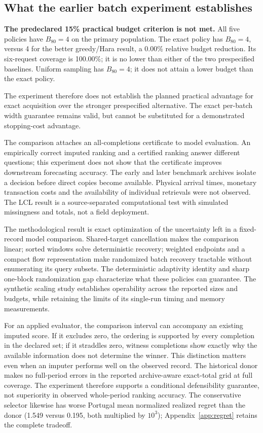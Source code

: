 \documentclass[12pt]{article}
\begin{document}
\subsection{What the earlier batch experiment establishes}
\textbf{The predeclared 15\% practical budget criterion is not met.} All five policies have $B_{80}=4$ on the primary population. The exact policy has $B_{80}=4$, versus 4 for the better greedy/Hara result, a 0.00\% relative budget reduction. Its six-request coverage is 100.00\%; it is no lower than either of the two prespecified baselines. Uniform sampling has $B_{80}=4$; it does not attain a lower budget than the exact policy.

The experiment therefore does not establish the planned practical advantage for exact acquisition over the stronger prespecified alternative. The exact per-batch width guarantee remains valid, but cannot be substituted for a demonstrated stopping-cost advantage.

The comparison attaches an all-completions certificate to model evaluation. An empirically correct imputed ranking and a certified ranking answer different questions; this experiment does not show that the certificate improves downstream forecasting accuracy. The early and later benchmark archives isolate a decision before direct copies become available. Physical arrival times, monetary transaction costs and the availability of individual retrievals were not observed. The LCL result is a source-separated computational test with simulated missingness and totals, not a field deployment.

The methodological result is exact optimization of the uncertainty left in
a fixed-record model comparison. Shared-target cancellation makes the
comparison linear; sorted windows solve deterministic recovery; weighted
endpoints and a compact flow representation make randomized batch recovery
tractable without enumerating its query subsets. The deterministic adaptivity
identity and sharp one-block randomization gap characterize what these
policies can guarantee. The synthetic scaling study establishes operability
across the reported sizes and budgets, while retaining the limits of its
single-run timing and memory measurements.

For an applied evaluator, the comparison interval can accompany an existing
imputed score. If it excludes zero, the ordering is supported by every
completion in the declared set; if it straddles zero, witness completions
show exactly why the available information does not determine the winner.
This distinction matters even when an imputer performs well on the observed
record. The historical donor makes no full-period errors in the reported
archive-aware exact-total grid at full coverage. The experiment therefore
supports a conditional defensibility guarantee, not superiority in observed
whole-period ranking accuracy. The conservative selector likewise has worse
Portugal mean normalized realized regret than the donor (1.549 versus 0.195,
both multiplied by $10^3$); Appendix~\ref{app:regret} retains the complete
tradeoff.
\end{document}
